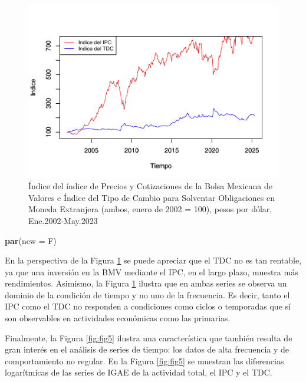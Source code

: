 \documentclass[
]{book}
\newenvironment{Shaded}{\begin{snugshade}}{\end{snugshade}}
\newcommand{\AttributeTok}[1]{\textcolor[rgb]{0.13,0.29,0.53}{#1}}
\newcommand{\FunctionTok}[1]{\textcolor[rgb]{0.13,0.29,0.53}{\textbf{#1}}}
\newcommand{\NormalTok}[1]{#1}
\begin{document}
\begin{figure}

{\centering \includegraphics{Notas-Series-Tiempo_files/figure-latex/fig4-1} 

}

\caption{Índice del índice de Precios y Cotizaciones de la Bolsa Mexicana de Valores e Índice del Tipo de Cambio para Solventar Obligaciones en Moneda Extranjera (ambos, enero de 2002 = 100), pesos por dólar, Ene.2002-May.2023 }\label{fig:fig4}
\end{figure}

\begin{Shaded}
\begin{Highlighting}[]
\FunctionTok{par}\NormalTok{(}\AttributeTok{new =}\NormalTok{ F)}
\end{Highlighting}
\end{Shaded}

En la perspectiva de la Figura \ref{fig:fig4} se puede apreciar que el TDC no es tan rentable, ya que una inversión en la BMV mediante el IPC, en el largo plazo, muestra más rendimientos. Asimismo, la Figura \ref{fig:fig4} ilustra que en ambas series se observa un dominio de la condición de tiempo y no uno de la frecuencia. Es decir, tanto el IPC como el TDC no responden a condiciones como ciclos o temporadas que sí son observables en actividades económicas como las
primarias.

Finalmente, la Figura \ref{fig:fig5} ilustra una característica que también resulta de gran interés en el análisis de series de tiempo: los datos de alta frecuencia y de comportamiento no regular. En la Figura \ref{fig:fig5} se muestran las diferencias logarítmicas de las series de IGAE de la actividad total, el IPC y el TDC.
\end{document}
